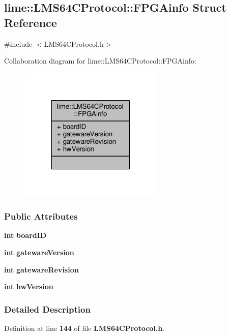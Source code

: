 \subsection{lime\+:\+:L\+M\+S64\+C\+Protocol\+:\+:F\+P\+G\+Ainfo Struct Reference}
\label{structlime_1_1LMS64CProtocol_1_1FPGAinfo}


{\ttfamily \#include $<$L\+M\+S64\+C\+Protocol.\+h$>$}



Collaboration diagram for lime\+:\+:L\+M\+S64\+C\+Protocol\+:\+:F\+P\+G\+Ainfo\+:
\nopagebreak
\begin{figure}[H]
\begin{center}
\leavevmode
\includegraphics[width=195pt]{da/d58/structlime_1_1LMS64CProtocol_1_1FPGAinfo__coll__graph}
\end{center}
\end{figure}
\subsubsection*{Public Attributes}
\begin{DoxyCompactItemize}
\item 
{\bf int} {\bf board\+ID}
\item 
{\bf int} {\bf gateware\+Version}
\item 
{\bf int} {\bf gateware\+Revision}
\item 
{\bf int} {\bf hw\+Version}
\end{DoxyCompactItemize}


\subsubsection{Detailed Description}


Definition at line {\bf 144} of file {\bf L\+M\+S64\+C\+Protocol.\+h}.



